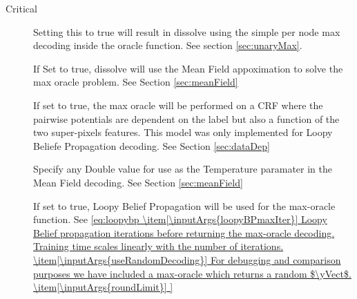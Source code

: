 Critical 
\begin{description}
\item[] Setting this to true will result in dissolve using the simple per node max decoding inside the oracle function. See section \ref{sec:unaryMax}.
\item[] If Set to true, dissolve will use the Mean Field appoximation to solve the max oracle problem. See Section \ref{sec:meanField}
\item[] If set to true, the max oracle will be performed on a CRF where the pairwise potentials are dependent on the label but also a function of the two super-pixels features. This model was only implemented for Loopy Beliefe Propagation decoding.  See Section \ref{sec:dataDep}
\item[] Specify any Double value for use as the Temperature paramater in the Mean Field decoding. See Section \ref{sec:meanField}
\item[] If set to true, Loopy Belief Propagation will be used for the max-oracle function. See \ref{eq:loopybp
\item[\inputArgs{loopyBPmaxIter}] Loopy Belief propagation iterations before returning the max-oracle decoding. Training time scales linearly with the number of iterations. 
\item[\inputArgs{useRandomDecoding}] For debugging and comparison purposes we have included a max-oracle which returns a random $\yVect$. 
\item[\inputArgs{roundLimit}]


}
\end{description}
